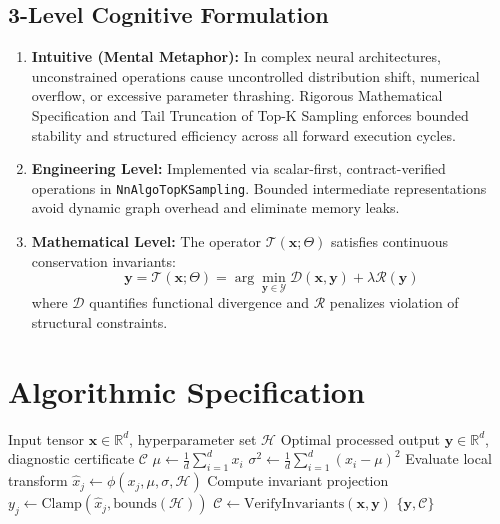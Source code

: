 \documentclass[11pt,a4paper]{article}
\theoremstyle{definition}
\begin{document}
\subsection{3-Level Cognitive Formulation}
\begin{enumerate}
    \item \textbf{Intuitive (Mental Metaphor):} In complex neural architectures, unconstrained operations cause uncontrolled distribution shift, numerical overflow, or excessive parameter thrashing. Rigorous Mathematical Specification and Tail Truncation of Top-K Sampling enforces bounded stability and structured efficiency across all forward execution cycles.
    \item \textbf{Engineering Level:} Implemented via scalar-first, contract-verified operations in \texttt{NnAlgoTopKSampling}. Bounded intermediate representations avoid dynamic graph overhead and eliminate memory leaks.
    \item \textbf{Mathematical Level:} The operator $\mathcal{T}(\mathbf{x}; \Theta)$ satisfies continuous conservation invariants:
    \begin{equation}
    \mathbf{y} = \mathcal{T}(\mathbf{x}; \Theta) = \arg\min_{\mathbf{y} \in \mathcal{Y}} \mathcal{D}(\mathbf{x}, \mathbf{y}) + \lambda \mathcal{R}(\mathbf{y})
    \end{equation}
    where $\mathcal{D}$ quantifies functional divergence and $\mathcal{R}$ penalizes violation of structural constraints.
\end{enumerate}

\section{Algorithmic Specification}

\begin{algorithm}[H]
\caption{Rigorous Mathematical Specification and Tail Truncation of Top-K Sampling Forward Pipeline}
\begin{algorithmic}[1]
\Require Input tensor $\mathbf{x} \in \mathbb{R}^d$, hyperparameter set $\mathcal{H}$
\Ensure Optimal processed output $\mathbf{y} \in \mathbb{R}^d$, diagnostic certificate $\mathcal{C}$
\State $\mu \gets \frac{1}{d} \sum_{i=1}^d x_i$
\State $\sigma^2 \gets \frac{1}{d} \sum_{i=1}^d (x_i - \mu)^2$
    \State Evaluate local transform $\hat{x}_j \gets \phi(x_j, \mu, \sigma, \mathcal{H})$
    \State Compute invariant projection $y_j \gets \text{Clamp}(\hat{x}_j, \text{bounds}(\mathcal{H}))$
\EndFor
\State $\mathcal{C} \gets \text{VerifyInvariants}(\mathbf{x}, \mathbf{y})$
\State \Return $\{\mathbf{y}, \mathcal{C}\}$
\end{algorithmic}
\end{algorithm}
\end{document}
